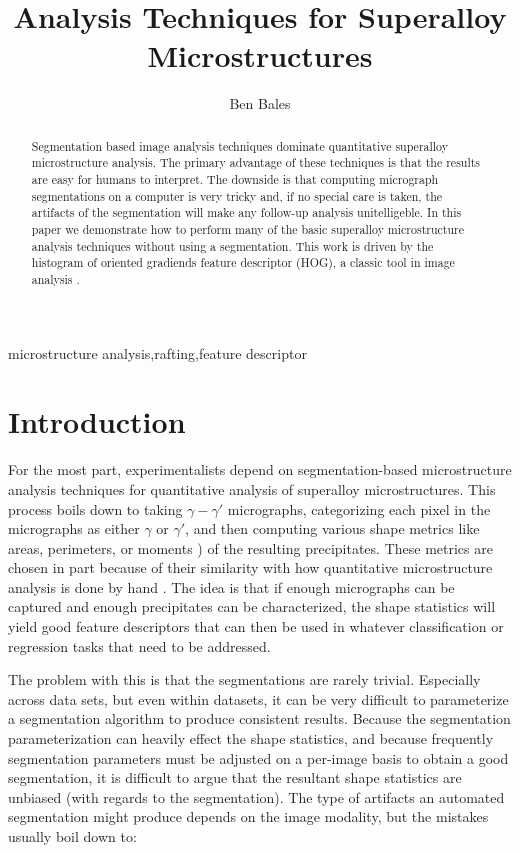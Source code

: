 \documentclass[review]{elsarticle}
\date{}
\begin{document}
	\begin{frontmatter}
		\title{Analysis Techniques for Superalloy Microstructures}

		\author{Ben Bales}
		\address{University of California Santa Barbara}

		\begin{abstract}
			Segmentation based image analysis techniques dominate quantitative superalloy microstructure analysis. The primary advantage of these techniques is that the results are easy for humans to interpret. The downside is that computing micrograph segmentations on a computer is very tricky and, if no special care is taken, the artifacts of the segmentation will make any follow-up analysis unitelligeble. In this paper we demonstrate how to perform many of the basic superalloy microstructure analysis techniques without using a segmentation. This work is driven by the histogram of oriented gradiends feature descriptor (HOG), a classic tool in image analysis \cite{gradtex, hog, girsh}.
		\end{abstract}

		\begin{keyword}
			microstructure analysis\sep rafting\sep feature descriptor
		\end{keyword}
	\end{frontmatter}

	\section{Introduction}
	For the most part, experimentalists depend on segmentation-based microstructure analysis techniques for quantitative analysis of superalloy microstructures. This process boils down to taking $\gamma-\gamma'$ micrographs, categorizing each pixel in the micrographs as either $\gamma$ or $\gamma'$, and then computing various shape metrics like areas, perimeters, or moments \cite{twoDM, threeDM}) of the resulting precipitates. These metrics are chosen in part because of their similarity with how quantitative microstructure analysis is done by hand \cite{sluytman, underwood}. The idea is that if enough micrographs can be captured and enough precipitates can be characterized, the shape statistics will yield good feature descriptors that can then be used in whatever classification or regression tasks that need to be addressed.

	The problem with this is that the segmentations are rarely trivial. Especially across data sets, but even within datasets, it can be very difficult to parameterize a segmentation algorithm to produce consistent results. Because the segmentation parameterization can heavily effect the shape statistics, and because frequently segmentation parameters must be adjusted on a per-image basis to obtain a good segmentation, it is difficult to argue that the resultant shape statistics are unbiased (with regards to the segmentation). The type of artifacts an automated segmentation might produce depends on the image modality, but the mistakes usually boil down to:
\end{document}
